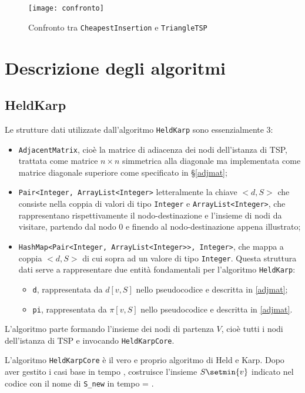 \begin{figure}[H]
	\centering
	\texttt{[image: confronto]}
	\caption{Confronto tra \texttt{CheapestInsertion} e \texttt{TriangleTSP}}
	\label{confronto}
\end{figure}

\newpage
\section{Descrizione degli algoritmi}
\subsection{HeldKarp}
Le strutture dati utilizzate dall'algoritmo \texttt{HeldKarp} sono essenzialmente 3:
\begin{itemize}
	\item \texttt{AdjacentMatrix}, cioè la matrice di adiacenza dei nodi dell'istanza di TSP, trattata come matrice $n\times n$ simmetrica alla diagonale ma implementata come matrice diagonale superiore come specificato in \S\ref{adjmat};
	\item \texttt{Pair<Integer, ArrayList<Integer>} letteralmente la chiave $<\!\!d,S\!\!>$ che consiste nella coppia di valori di tipo \texttt{Integer} e \texttt{ArrayList<Integer>}, che rappresentano rispettivamente il nodo-destinazione e l'insieme di nodi da visitare, partendo dal nodo 0 e finendo al nodo-destinazione appena illustrato;
	\item \texttt{HashMap<Pair<Integer, ArrayList<Integer>>, Integer>}, che mappa a coppia $<\!\!d,S\!\!>$ di cui sopra ad un valore di tipo \texttt{Integer}. Questa struttura dati serve a rappresentare due entità fondamentali per l'algoritmo \texttt{HeldKarp}:
	\begin{itemize}
		\item \texttt{d}, rappresentata da $d[v,S]$ nello pseudocodice e descritta in \ref{adjmat};
		\item \texttt{pi}, rappresentata da $\pi[v,S]$ nello pseudocodice e descritta in \ref{adjmat}.
	\end{itemize}
\end{itemize}

L'algoritmo parte formando l'insieme dei nodi di partenza $V$, cioè tutti i nodi dell'istanza di TSP e invocando \texttt{HeldKarpCore}.\eqcapo

L'algoritmo \texttt{HeldKarpCore} è il vero e proprio algoritmo di Held e Karp. Dopo aver gestito i casi base in tempo , costruisce l'insieme $S\setmin \{v\}$ indicato nel codice con il nome di \texttt{S\_new} in tempo  = .\eqcapo

